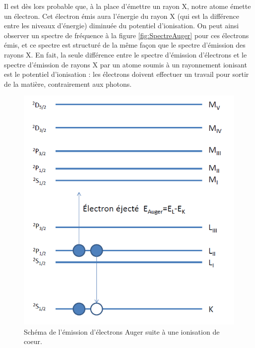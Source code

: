 Il est dès lors probable que, à la place d'émettre un rayon X, notre atome émette un électron. Cet électron émis aura l'énergie du rayon X (qui est la différence entre les niveaux d'énergie) diminuée du potentiel d'ionisation. On peut ainsi observer un spectre de fréquence à la figure \ref{fig:SpectreAuger} pour ces électrons émis, et ce spectre est structuré de la même façon que le spectre d'émission des rayons X. En fait, la seule différence entre le spectre d'émission d'électrons et le spectre d'émission de rayons X par un atome soumis à un rayonnement ionisant est le potentiel d'ionisation : les électrons doivent effectuer un travail pour sortir de la matière, contrairement aux photons.
\begin{figure}[htp]
    \centering
    \includegraphics[scale=0.8]{Images2/Auger.PNG}
    \caption{Schéma de l'émission d'électrons Auger suite à une ionisation de coeur.}
    \label{fig : Auger}
\end{figure}
